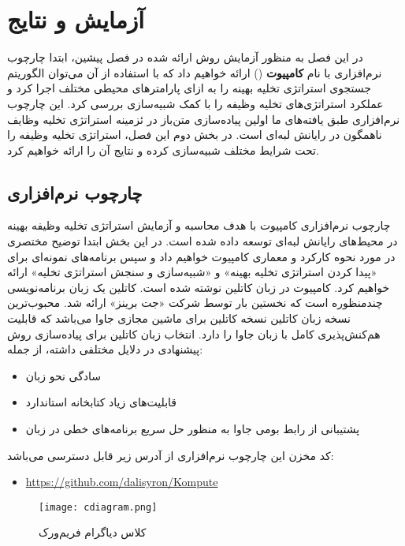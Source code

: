 \chapter{آزمایش و نتایج}
در این فصل به منظور آزمایش روش ارائه شده در فصل پیشین، ابتدا چارچوب نرم‌افزاری با نام \textbf{کامپیوت} () ارائه خواهیم داد که با استفاده از آن می‌توان الگوریتم جستجوی استراتژی تخلیه بهینه را به ازای پارامترهای محیطی مختلف اجرا کرد و عملکرد استراتژی‌های تخلیه وظیفه را با کمک شبیه‌سازی بررسی کرد. این چارچوب نرم‌افزاری طبق یافته‌های ما اولین پیاده‌سازی متن‌باز در ئزمینه استراتژی تخلیه وظایف ناهمگون در رایانش لبه‌ای است. در بخش دوم این فصل، استراتژی تخلیه وظیفه را تحت شرایط مختلف شبیه‌سازی کرده و نتایج آن را ارائه خواهیم کرد.
\section{چارچوب نرم‌افزاری }
چارچوب نرم‌افزاری کامپیوت با هدف محاسبه و آزمایش استراتژی تخلیه وظیفه بهینه در محیط‌های رایانش لبه‌ای توسعه داده شده است. در این بخش ابتدا توضیح مختصری در مورد نحوه کارکرد و معماری کامپیوت خواهیم داد و سپس برنامه‌های نمونه‌ای برای «پیدا کردن استراتژی تخلیه بهینه» و «شبیه‌سازی و سنجش استراتژی تخلیه» ارائه خواهیم کرد. کامپیوت در زبان کاتلین نوشته شده است. کاتلین یک زبان برنامه‌نویسی چندمنظوره است که نخستین بار توسط شرکت «جت برینز» ارائه شد. محبوب‌ترین نسخه زبان کاتلین نسخه کاتلین برای ماشین مجازی جاوا می‌باشد که قابلیت هم‌کنش‌پذیری کامل با زبان جاوا را دارد. انتخاب زبان کاتلین برای پیاده‌سازی روش پیشنهادی در \CurrentProject دلایل مختلفی داشته، از جمله:
\begin{itemize}
	\item سادگی نحو زبان
	\item قابلیت‌های زیاد کتابخانه استاندارد
	\item پشتیبانی از رابط بومی جاوا به منظور حل سریع برنامه‌های خطی در زبان 
\end{itemize}
کد مخزن این چارچوب نرم‌افزاری از آدرس زیر قابل دسترسی می‌باشد:
\begin{latin}
	\begin{itemize}
		\item \href{https://github.com/dalisyron/Kompute}{https://github.com/dalisyron/Kompute}
	\end{itemize}
\end{latin}

\newpage
\begin{figure}[H]
	\texttt{[image: cdiagram.png]}
	\caption{کلاس دیاگرام فریم‌ورک }
\end{figure}
\newpage
